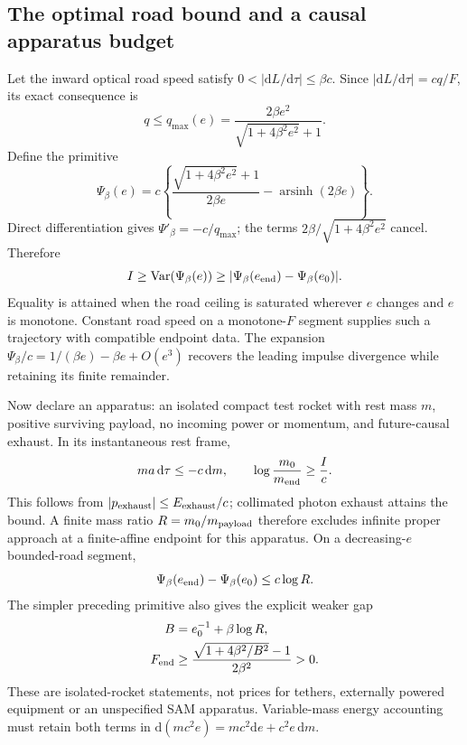 \documentclass[10pt,twocolumn,letterpaper]{article}
\newcommand{\dd}{\mathrm{d}}
\newcommand{\Var}{\operatorname{Var}}
\begin{document}
\subsection{The optimal road bound and a causal apparatus budget}
Let the inward optical road speed satisfy $0<|\dd L/\dd\tau|\le\beta c$.
Since $|\dd L/\dd\tau|=cq/F$, its exact consequence is
\begin{equation}
 q\le q_{\max}(e)=\frac{2\beta e^2}{\sqrt{1+4\beta^2e^2}+1}.
\end{equation}
Define the primitive
\begin{equation}
 \Psi_\beta(e)=c\left\{
 \frac{\sqrt{1+4\beta^2e^2}+1}{2\beta e}
       -\operatorname{arsinh}(2\beta e)\right\}.
\end{equation}
Direct differentiation gives $\Psi'_\beta=-c/q_{\max}$; the terms
$2\beta/\sqrt{1+4\beta^2e^2}$ cancel. Therefore
\begin{equation}
 I\ge\Var(\Psi_\beta(e))
       \ge|\Psi_\beta(e_{\rm end})-\Psi_\beta(e_0)| .
\end{equation}
Equality is attained when the road ceiling is saturated wherever $e$
changes and $e$ is monotone. Constant road speed on a monotone-$F$
segment supplies such a trajectory with compatible endpoint data.
The expansion $\Psi_\beta/c=1/(\beta e)-\beta e+O(e^3)$ recovers the
leading impulse divergence while retaining its finite remainder.

Now declare an apparatus: an isolated compact test rocket with rest mass
$m$, positive surviving payload, no incoming power or momentum, and
future-causal exhaust. In its instantaneous rest frame,
\begin{equation}
 ma\,\dd\tau\le-c\,\dd m,\qquad
 \log\frac{m_0}{m_{\rm end}}\ge\frac Ic .
\end{equation}
This follows from $|p_{\rm exhaust}|\le E_{\rm exhaust}/c$; collimated
photon exhaust attains the bound. A finite mass ratio $R=m_0/m_{\rm payload}$
therefore excludes infinite proper approach at a finite-affine endpoint
for this apparatus. On a decreasing-$e$ bounded-road segment,
\begin{equation}
 \Psi_\beta(e_{\rm end})-\Psi_\beta(e_0)\le c\log R .
\end{equation}
The simpler preceding primitive also gives the explicit weaker gap
\begin{equation}
 \begin{split}
 B&=e_0^{-1}+\beta\log R,\\
 F_{\rm end}&\ge\frac{\sqrt{1+4\beta^2/B^2}-1}{2\beta^2}>0 .
 \end{split}
\end{equation}
These are isolated-rocket statements, not prices for tethers, externally
powered equipment or an unspecified SAM apparatus. Variable-mass energy
accounting must retain both terms in
$\dd(mc^2e)=mc^2\dd e+c^2e\,\dd m$.
\end{document}
